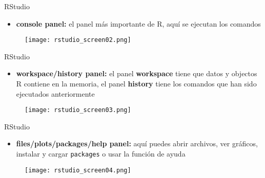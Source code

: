 \documentclass{beamer}
\begin{document}
\begin{frame}{RStudio}
\begin{itemize}
\item \textbf{console panel:} el panel más importante de R, aquí se ejecutan los comandos 
\end{itemize}
\begin{figure}[H]
\centering
\texttt{[image: rstudio\_screen02.png]}
\end{figure}
\end{frame}

\begin{frame}{RStudio}
\begin{itemize}
\item \textbf{workspace/history panel:} el panel \textbf{workspace} tiene que datos y objectos R contiene en la memoria, el panel \textbf{history} tiene los comandos que han sido ejecutados anteriormente
\end{itemize}
\begin{figure}[H]
\centering
\texttt{[image: rstudio\_screen03.png]}
\end{figure}
\end{frame}

\begin{frame}{RStudio}
\begin{itemize}
\item \textbf{files/plots/packages/help panel:} aquí puedes abrir archivos, ver gráficos, instalar y cargar \texttt{packages} o usar la función de ayuda
\end{itemize}
\begin{figure}[H]
\centering
\texttt{[image: rstudio\_screen04.png]}
\end{figure}
\end{frame}
\end{document}

